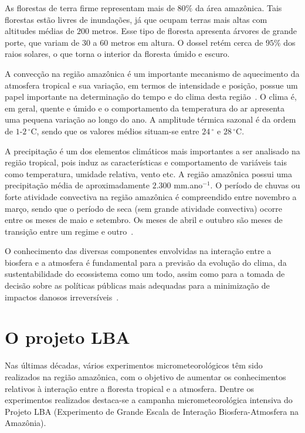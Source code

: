 As florestas de terra firme representam mais de $80\%$ da área amazônica. Tais florestas estão livres de inundações, já que ocupam terras mais altas com altitudes médias de $200$ metros. Esse tipo de floresta apresenta árvores de grande porte, que variam de $30$ a $60$ metros em altura. O dossel retém cerca de $95\%$ dos raios solares, o que torna o interior da floresta úmido e escuro. 

A convecção na região amazônica é um importante mecanismo de aquecimento da atmosfera tropical e sua variação, em termos de intensidade e posição, possue um papel importante na determinação do tempo e do clima desta região~\cite{fisch/98}. O clima é, em geral, quente e úmido e o comportamento da temperatura do ar apresenta uma pequena variação ao longo do ano. A amplitude térmica sazonal é da ordem de $1$-$2\,^{\circ}$C, sendo que os valores médios situam-se entre $24\,^{\circ}$ e $28\,^{\circ}$C.

A precipitação é um dos elementos climáticos mais importantes a ser analisado na região tropical, pois induz as características e comportamento de variáveis tais como temperatura, umidade relativa, vento etc. A região amazônica possui uma precipitação média de aproximadamente $2.300$ mm.ano$^{-1}$. O período de chuvas ou forte atividade convectiva na região amazônica é compreendido entre novembro a março, sendo que o período de seca (sem grande atividade convectiva) ocorre entre os meses de maio e setembro. Os meses de abril e outubro são meses de transição entre um regime e outro~\cite{fisch/98}.

O conhecimento das diversas componentes envolvidas na interação entre a biosfera e a atmosfera é fundamental para a previsão da evolução do clima, da sustentabilidade do ecossistema como um todo, assim como para a tomada de decisão sobre as políticas públicas mais adequadas para a minimização de impactos danosos irreversíveis~\cite{silvadias/05}. 

 
\section{O projeto LBA}

Nas últimas décadas, vários experimentos micrometeorológicos têm sido realizados na região amazônica, com o objetivo de aumentar os conhecimentos relativos à interação entre a floresta tropical e a atmosfera. Dentre os experimentos realizados destaca-se a campanha micrometeorológica intensiva do Projeto LBA (Experimento de Grande Escala de Interação Biosfera-Atmosfera na Amazônia). 

